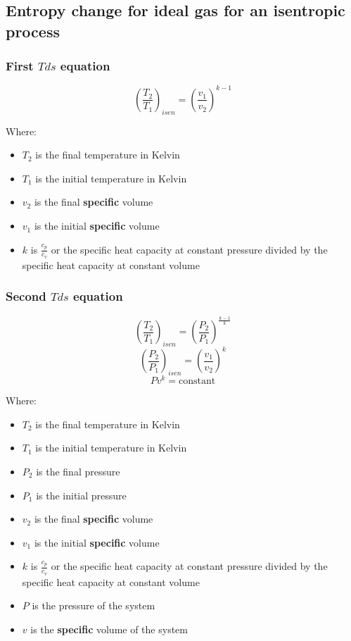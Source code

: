 \documentclass[11pt]{article}
\begin{document}
\subsection{Entropy change for ideal gas for an isentropic process}
\label{sec:org0e24bb7}

\subsubsection{First \(T ds\) equation}
\label{sec:org0ea2bdf}
\[\left(\frac{T_2}{T_1} \right)_{isen} = \left(\frac{v_1}{v_2} \right)^{k - 1}\]

Where:
\begin{itemize}
\item \(T_2\) is the final temperature in Kelvin
\item \(T_1\) is the initial temperature in Kelvin
\item \(v_2\) is the final \textbf{specific} volume
\item \(v_1\) is the initial \textbf{specific} volume
\item \(k\) is \(\frac{c_p}{c_v}\) or the specific heat capacity at constant pressure divided by the specific heat capacity at constant volume
\end{itemize}
\subsubsection{Second \(T ds\) equation}
\label{sec:org6826810}
\[\left(\frac{T_2}{T_1} \right)_{isen} = \left(\frac{P_2}{P_1} \right)^{\frac{k - 1}{k}}\]
\[\left(\frac{P_2}{P_1} \right)_{isen} = \left(\frac{v_1}{v_2} \right)^{k}\]
\[Pv^{k} = \text{constant}\]

Where:
\begin{itemize}
\item \(T_2\) is the final temperature in Kelvin
\item \(T_1\) is the initial temperature in Kelvin
\item \(P_2\) is the final pressure
\item \(P_1\) is the initial pressure
\item \(v_2\) is the final \textbf{specific} volume
\item \(v_1\) is the initial \textbf{specific} volume
\item \(k\) is \(\frac{c_p}{c_v}\) or the specific heat capacity at constant pressure divided by the specific heat capacity at constant volume
\item \(P\) is the pressure of the system
\item \(v\) is the \textbf{specific} volume of the system
\end{itemize}
\end{document}
